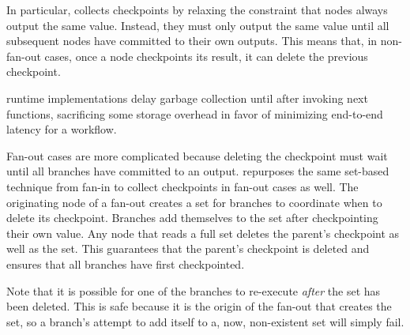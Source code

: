 In particular, \name{} collects checkpoints by relaxing the constraint that
nodes always output the same value. Instead, they must only output the same
value until all subsequent nodes have committed to their own outputs. This
means that, in non-fan-out cases, once a node checkpoints its result, it can
delete the previous checkpoint.


\name{} runtime implementations delay garbage collection
until after invoking next functions, sacrificing some storage overhead in
favor of minimizing end-to-end latency for a workflow.

Fan-out cases are more complicated because deleting the checkpoint must wait
until all branches have committed to an output. \name{} repurposes the same
set-based technique from fan-in to collect checkpoints in fan-out cases as well.
The originating node of a fan-out creates a set for branches to coordinate when
to delete its checkpoint. Branches add themselves to the set after checkpointing
their own value. Any node that reads a full set deletes the parent's checkpoint
as well as the set. This guarantees that the parent's checkpoint is deleted and
ensures that all branches have first checkpointed.

Note that it is possible for one of the branches to re-execute \emph{after} the
set has been deleted. This is safe because it is the origin of the fan-out that
creates the set, so a branch's attempt to add itself to a, now, non-existent set
will simply fail.



